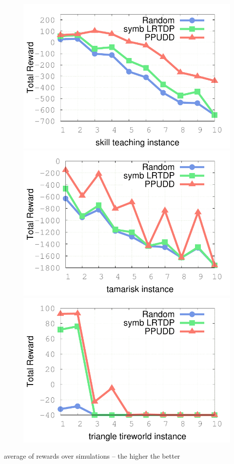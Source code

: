 \documentclass[12pt,svgnames,table]{beamer}
\begin{document}
\begin{frame}
\begin{figure}
\vspace{0.5cm}
\includegraphics[scale=0.3]{IPPC2014_results/skill_teaching.pdf} 
\includegraphics[scale=0.3]{IPPC2014_results/tamarisk.pdf}
\includegraphics[scale=0.3]{IPPC2014_results/triangle_tireworld.pdf} 
\end{figure}
{\color{orange} average of rewards over simulations} \hspace{0.2cm} -- \hspace{0.2cm} {\color{gggreen} the higher the better }
\end{frame}
\end{document}
